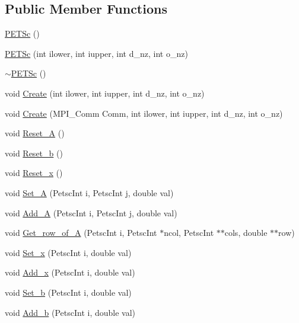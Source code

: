 \subsection*{Public Member Functions}
\begin{DoxyCompactItemize}
\item 
\hyperlink{class_p_e_t_sc_a3ea1e089900990235f40b0c7ca843f75}{P\+E\+T\+Sc} ()
\item 
\hyperlink{class_p_e_t_sc_a462adc44d78a5699b1b34f21ea87eabb}{P\+E\+T\+Sc} (int ilower, int iupper, int d\+\_\+nz, int o\+\_\+nz)
\item 
\hyperlink{class_p_e_t_sc_a619fc92a3221a6fb3d0e81cc0db1da97}{$\sim$\+P\+E\+T\+Sc} ()
\item 
void \hyperlink{class_p_e_t_sc_a094c1fa3e85539cb67049ef1b843a506}{Create} (int ilower, int iupper, int d\+\_\+nz, int o\+\_\+nz)
\item 
void \hyperlink{class_p_e_t_sc_a09d4bc4a4ef859fe190020afb4031aef}{Create} (M\+P\+I\+\_\+\+Comm Comm, int ilower, int iupper, int d\+\_\+nz, int o\+\_\+nz)
\item 
void \hyperlink{class_p_e_t_sc_a854afd9c485101d4a5ee541275593382}{Reset\+\_\+A} ()
\item 
void \hyperlink{class_p_e_t_sc_a7393f837fedd0d4e542d4808856e0a0a}{Reset\+\_\+b} ()
\item 
void \hyperlink{class_p_e_t_sc_ad733dbc01bec4dc6605795d990c2a77d}{Reset\+\_\+x} ()
\item 
void \hyperlink{class_p_e_t_sc_a6e5a7228573e0bf0964f966903374dba}{Set\+\_\+A} (Petsc\+Int i, Petsc\+Int j, double val)
\item 
void \hyperlink{class_p_e_t_sc_a01ebd44bf847dc10421e27249d155531}{Add\+\_\+A} (Petsc\+Int i, Petsc\+Int j, double val)
\item 
void \hyperlink{class_p_e_t_sc_a9bb9d0fc06b9bc1eac0cd764fd218d20}{Get\+\_\+row\+\_\+of\+\_\+A} (Petsc\+Int i, Petsc\+Int $\ast$ncol, Petsc\+Int $\ast$$\ast$cols, double $\ast$$\ast$row)
\item 
void \hyperlink{class_p_e_t_sc_a60bf502ac980aa6ec00fcfd2aac46a9e}{Set\+\_\+x} (Petsc\+Int i, double val)
\item 
void \hyperlink{class_p_e_t_sc_a3f3b4b2ab8ef8c597e9faf7a33afb3c6}{Add\+\_\+x} (Petsc\+Int i, double val)
\item 
void \hyperlink{class_p_e_t_sc_a5d8c9972629798fbdea081addd8d4837}{Set\+\_\+b} (Petsc\+Int i, double val)
\item 
void \hyperlink{class_p_e_t_sc_a6127666e818127157b79b0ecf8833d7a}{Add\+\_\+b} (Petsc\+Int i, double val)

\end{DoxyCompactItemize}
